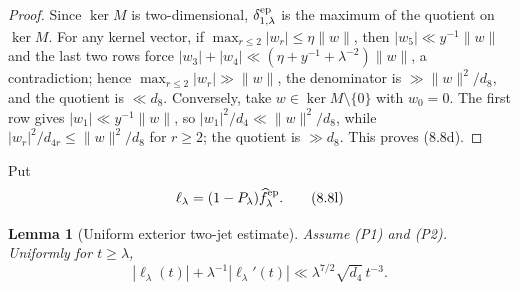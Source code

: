 \documentclass[11pt]{amsart}
\newtheorem{lemma}[theorem]{Lemma}
\theoremstyle{definition}
\theoremstyle{remark}
\begin{document}
\begin{proof}
Since \(\ker M\) is two-dimensional, \(\delta_{1,\lambda}^{\rm ep}\) is
the maximum of the quotient on \(\ker M\).  For any kernel vector, if
\(\max_{r\le2}|w_r|\le\eta\|w\|\), then \(|w_5|\ll y^{-1}\|w\|\) and the
last two rows force \(|w_3|+|w_4|\ll(\eta+y^{-1}+\lambda^{-2})\|w\|\), a
contradiction; hence \(\max_{r\le2}|w_r|\gg\|w\|\), the denominator is
\(\gg\|w\|^2/d_8\), and the quotient is \(\ll d_8\).  Conversely, take
\(w\in\ker M\setminus\{0\}\) with \(w_0=0\).  The first row gives
\(|w_1|\ll y^{-1}\|w\|\), so \(|w_1|^2/d_4\ll\|w\|^2/d_8\), while
\(|w_r|^2/d_{4r}\le\|w\|^2/d_8\) for \(r\ge2\); the quotient is
\(\gg d_8\).  This proves (8.8d).
\end{proof}

Put
\[
 \ell_\lambda=(1-P_\lambda)\widehat f_\lambda^{\rm ep}.
\tag{8.8l}
\]

\begin{lemma}[Uniform exterior two-jet estimate]
\label{lem:uniform-exterior-two-jet}
Assume (P1) and (P2).  Uniformly for \(t\ge\lambda\),
\[
 \boxed{
 |\ell_\lambda(t)|+
 \lambda^{-1}|\ell_\lambda'(t)|
 \ll \lambda^{7/2}\sqrt{d_4}\,t^{-3}.}
\tag{8.8m}
\]
\end{lemma}
\end{document}
